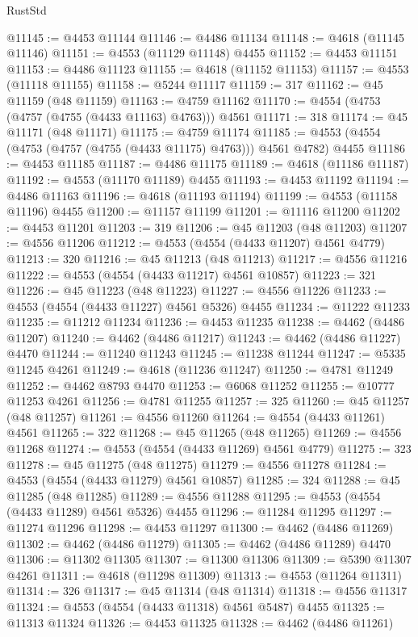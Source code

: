 \begin{lexlean}{RustStd}
\begin{coremodule}
@11145 := @4453 @11144
@11146 := @4486 @11134
@11148 := @4618 (@11145 @11146)
@11151 := @4553 (@11129 @11148) @4455
@11152 := @4453 @11151
@11153 := @4486 @11123
@11155 := @4618 (@11152 @11153)
@11157 := @4553 (@11118 @11155)
@11158 := @5244 @11117
@11159 := 317
@11162 := @45 @11159 (@48 @11159)
@11163 := @4759 @11162
@11170 := @4554 (@4753 (@4757 (@4755 (@4433 @11163) @4763))) @4561
@11171 := 318
@11174 := @45 @11171 (@48 @11171)
@11175 := @4759 @11174
@11185 := @4553 (@4554 (@4753 (@4757 (@4755 (@4433 @11175) @4763))) @4561 @4782) @4455
@11186 := @4453 @11185
@11187 := @4486 @11175
@11189 := @4618 (@11186 @11187)
@11192 := @4553 (@11170 @11189) @4455
@11193 := @4453 @11192
@11194 := @4486 @11163
@11196 := @4618 (@11193 @11194)
@11199 := @4553 (@11158 @11196) @4455
@11200 := @11157 @11199
@11201 := @11116 @11200
@11202 := @4453 @11201
@11203 := 319
@11206 := @45 @11203 (@48 @11203)
@11207 := @4556 @11206
@11212 := @4553 (@4554 (@4433 @11207) @4561 @4779)
@11213 := 320
@11216 := @45 @11213 (@48 @11213)
@11217 := @4556 @11216
@11222 := @4553 (@4554 (@4433 @11217) @4561 @10857)
@11223 := 321
@11226 := @45 @11223 (@48 @11223)
@11227 := @4556 @11226
@11233 := @4553 (@4554 (@4433 @11227) @4561 @5326) @4455
@11234 := @11222 @11233
@11235 := @11212 @11234
@11236 := @4453 @11235
@11238 := @4462 (@4486 @11207)
@11240 := @4462 (@4486 @11217)
@11243 := @4462 (@4486 @11227) @4470
@11244 := @11240 @11243
@11245 := @11238 @11244
@11247 := @5335 @11245 @4261
@11249 := @4618 (@11236 @11247)
@11250 := @4781 @11249
@11252 := @4462 @8793 @4470
@11253 := @6068 @11252
@11255 := @10777 @11253 @4261
@11256 := @4781 @11255
@11257 := 325
@11260 := @45 @11257 (@48 @11257)
@11261 := @4556 @11260
@11264 := @4554 (@4433 @11261) @4561
@11265 := 322
@11268 := @45 @11265 (@48 @11265)
@11269 := @4556 @11268
@11274 := @4553 (@4554 (@4433 @11269) @4561 @4779)
@11275 := 323
@11278 := @45 @11275 (@48 @11275)
@11279 := @4556 @11278
@11284 := @4553 (@4554 (@4433 @11279) @4561 @10857)
@11285 := 324
@11288 := @45 @11285 (@48 @11285)
@11289 := @4556 @11288
@11295 := @4553 (@4554 (@4433 @11289) @4561 @5326) @4455
@11296 := @11284 @11295
@11297 := @11274 @11296
@11298 := @4453 @11297
@11300 := @4462 (@4486 @11269)
@11302 := @4462 (@4486 @11279)
@11305 := @4462 (@4486 @11289) @4470
@11306 := @11302 @11305
@11307 := @11300 @11306
@11309 := @5390 @11307 @4261
@11311 := @4618 (@11298 @11309)
@11313 := @4553 (@11264 @11311)
@11314 := 326
@11317 := @45 @11314 (@48 @11314)
@11318 := @4556 @11317
@11324 := @4553 (@4554 (@4433 @11318) @4561 @5487) @4455
@11325 := @11313 @11324
@11326 := @4453 @11325
@11328 := @4462 (@4486 @11261)

\end{coremodule}
\end{lexlean}
